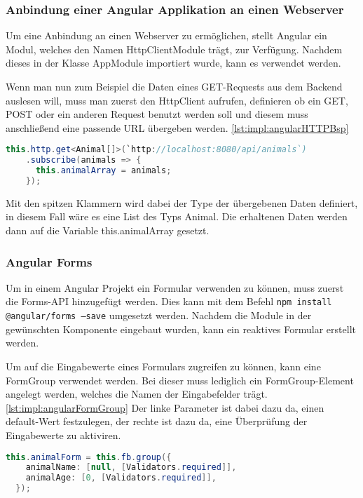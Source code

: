 \subsubsection{Anbindung einer Angular Applikation an einen Webserver}
Um eine Anbindung an einen Webserver zu ermöglichen, stellt Angular ein Modul, welches den Namen HttpClientModule trägt, zur Verfügung. Nachdem dieses in der Klasse AppModule importiert wurde, kann es verwendet werden.

Wenn man nun zum Beispiel die Daten eines GET-Requests aus dem Backend auslesen will, muss man zuerst den HttpClient aufrufen, definieren ob ein GET, POST oder ein anderen Request benutzt werden soll und diesem muss anschließend eine passende URL übergeben werden. \ref{lst:impl:angularHTTPBsp}

\begin{lstlisting}[language=java,caption=Beispiel für einen GET-Request,label=lst:impl:angularHTTPBsp]
  this.http.get<Animal[]>(`http://localhost:8080/api/animals`)
    .subscribe(animals => {
      this.animalArray = animals;
    });
\end{lstlisting}

Mit den spitzen Klammern wird dabei der Type der übergebenen Daten definiert, in diesem Fall wäre es eine List des Typs Animal. Die erhaltenen Daten werden dann auf die Variable this.animalArray gesetzt.

\subsubsection{Angular Forms}
Um in einem Angular Projekt ein Formular verwenden zu können, muss zuerst die Forms-API hinzugefügt werden. Dies kann mit dem Befehl \texttt{npm install @angular/forms --save} umgesetzt werden. Nachdem die Module in der gewünschten Komponente eingebaut wurden, kann ein reaktives Formular erstellt werden.

Um auf die Eingabewerte eines Formulars zugreifen zu können, kann eine FormGroup verwendet werden. Bei dieser muss lediglich ein FormGroup-Element angelegt werden, welches die Namen der Eingabefelder trägt. \ref{lst:impl:angularFormGroup} Der linke Parameter ist dabei dazu da, einen default-Wert festzulegen, der rechte ist dazu da, eine Überprüfung der Eingabewerte zu aktiviren.

\begin{lstlisting}[language=java,caption=Beispiel für FormGroup eines Angular Formulars,label=lst:impl:angularFormGroup]
  this.animalForm = this.fb.group({
    animalName: [null, [Validators.required]],
    animalAge: [0, [Validators.required]],
  });
\end{lstlisting}

